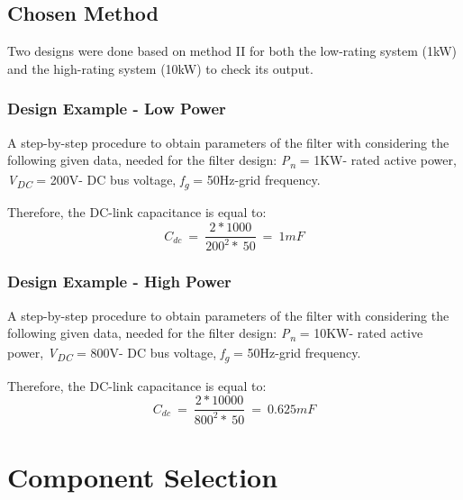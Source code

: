 \documentclass[12pt,a4paper]{book}
\begin{document}
\subsection{Chosen Method}
Two designs were done based on method II for both the low-rating system (1kW) and the high-rating system (10kW) to check its output.

\subsubsection{Design Example - Low Power}
A step-by-step procedure to obtain parameters of the filter with considering the following given data, needed for the filter design: \emph{P\textsubscript{n}} = 1KW- rated active power, \emph{V\textsubscript{DC}} = 200V- DC bus voltage, \emph{f\textsubscript{g}} = 50Hz-grid frequency.

Therefore, the DC-link capacitance is equal to:
\[C_{dc}\  = \ \frac{2*1000}{200^{2}*\ 50}\  = \ 1mF\]

\subsubsection{Design Example - High Power}
A step-by-step procedure to obtain parameters of the filter with considering the following given data, needed for the filter design: \emph{P\textsubscript{n}} = 10KW- rated active power, \emph{V\textsubscript{DC}} = 800V- DC bus voltage, \emph{f\textsubscript{g}} = 50Hz-grid frequency.

Therefore, the DC-link capacitance is equal to:
\[C_{dc}\  = \ \frac{2*10000}{800^{2}*\ 50}\  = \ 0.625mF\]

\section{Component Selection}
\end{document}
